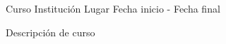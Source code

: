 
\begin{cventries}
  \cventry
    {Curso} %
    {Institución} %
    {Lugar} %
    {Fecha inicio - Fecha final} %
    {
      \begin{cvitems} %
      \item {Descripción de curso}
      \end{cvitems}
    }
\end{cventries}
